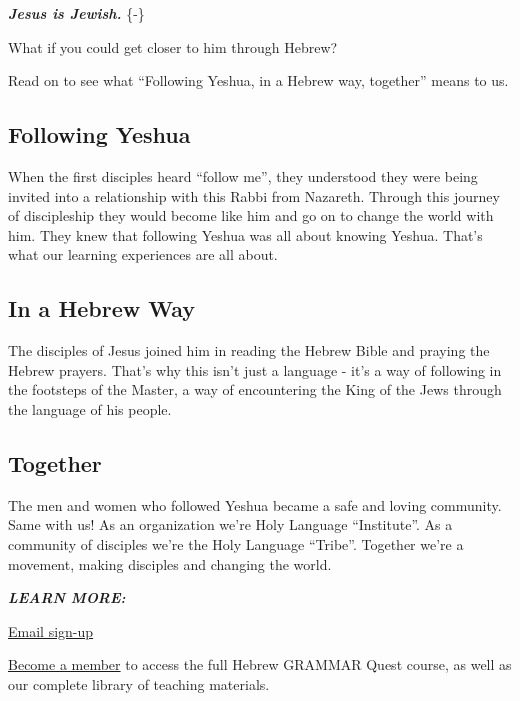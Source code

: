 \documentclass[
]{turabian-researchpaper}
\begin{document}
\textbf{\emph{Jesus is Jewish.}} \{-\}

What if you could get closer to him through Hebrew?

Read on to see what ``Following Yeshua, in a Hebrew way, together'' means to us.

\hypertarget{following-yeshua}{%
\subsection*{Following Yeshua}\label{following-yeshua}}

When the first disciples heard ``follow me'', they understood they were being invited into a relationship with this Rabbi from Nazareth. Through this journey of discipleship they would become like him and go on to change the world with him. They knew that following Yeshua was all about knowing Yeshua. That's what our learning experiences are all about.

\hypertarget{in-a-hebrew-way}{%
\subsection*{In a Hebrew Way}\label{in-a-hebrew-way}}

The disciples of Jesus joined him in reading the Hebrew Bible and praying the Hebrew prayers. That's why this isn't just a language - it's a way of following in the footsteps of the Master, a way of encountering the King of the Jews through the language of his people.

\hypertarget{together}{%
\subsection*{Together}\label{together}}

The men and women who followed Yeshua became a safe and loving community. Same with us! As an organization we're Holy Language ``Institute''. As a community of disciples we're the Holy Language ``Tribe''. Together we're a movement, making disciples and changing the world.

\textbf{\emph{LEARN MORE:}}

\href{https://holylanguage.com/index.html}{Email sign-up}

\href{https://holylanguage.com/subscribe.html}{Become a member} to access the full Hebrew GRAMMAR Quest course, as well as our complete library of teaching materials.
\end{document}
